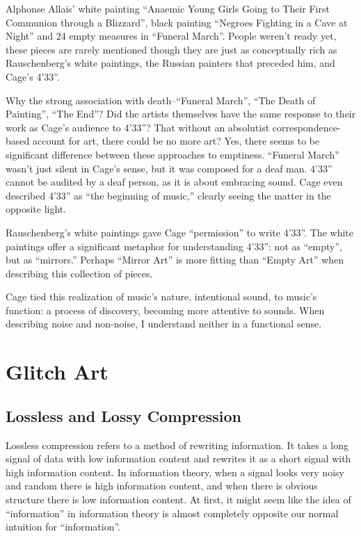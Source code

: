 \documentclass{thesis}
\begin{document}
	Alphonse Allais' white painting ``Anaemic Young Girls Going to Their First Communion through a Blizzard'', black painting ``Negroes Fighting in a Cave at Night'' and 24 empty measures in ``Funeral March''. People weren't ready yet, these pieces are rarely mentioned though they are just as conceptually rich as Rauschenberg's white paintings, the Russian painters that preceded him, and Cage's 4'33''.
	
	Why the strong association with death--``Funeral March'', ``The Death of Painting'', ``The End''? Did the artists themselves have the same response to their work as Cage's audience to 4'33''? That without an absolutist correspondence-based account for art, there could be no more art? Yes, there seems to be significant difference between these approaches to emptiness. ``Funeral March'' wasn't just silent in Cage's sense, but it was composed for a deaf man. 4'33'' cannot be audited by a deaf person, as it is about embracing sound. Cage even described 4'33'' as ``the beginning of music,'' clearly seeing the matter in the opposite light.
	
	Rauschenberg's white paintings gave Cage ``permission'' to write 4'33''. The white paintings offer a significant metaphor for understanding 4'33'': not as ``empty'', but as ``mirrors.'' Perhaps ``Mirror Art'' is more fitting than ``Empty Art'' when describing this collection of pieces.
	
	Cage tied this realization of music's nature, intentional sound, to music's function: a process of discovery, becoming more attentive to sounds. When describing noise and non-noise, I understand neither in a functional sense.

\chapter{Glitch Art}

\section{Lossless and Lossy Compression}
	Lossless compression refers to a method of rewriting information. It takes a long signal of data with low information content and rewrites it as a short signal with high information content. In information theory, when a signal looks very noisy and random there is high information content, and when there is obvious structure there is low information content. At first, it might seem like the idea of ``information'' in information theory is almost completely opposite our normal intuition for ``information''.
	
\end{document}
